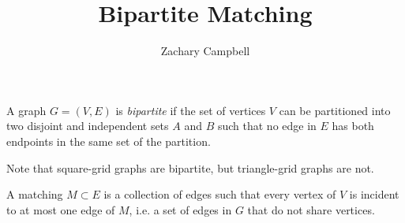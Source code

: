 \documentclass[11pt]{article}
\newenvironment{definition}[2][Definition]{\begin{trivlist}
\item[\hskip \labelsep {\bfseries #1}\hskip \labelsep {\bfseries #2.}]}{\end{trivlist}}
\begin{document}
\title{Bipartite Matching}
\author{Zachary Campbell}

\maketitle

\begin{definition}{(Bipartite graph)}
	A graph $G = (V, E)$ is \emph{bipartite} if the set of vertices $V$ can be partitioned into 
	two disjoint and independent sets $A$ and $B$ such that no edge in $E$ has both endpoints in 
	the same set of the partition.
\end{definition}

Note that square-grid graphs are bipartite, but triangle-grid graphs are not. 

\begin{definition}{(Matching)}
	A matching $M\subset E$ is a collection of edges such that every vertex of $V$ is incident 
	to at most one edge of $M$, i.e. a set of edges in $G$ that do not share vertices.
\end{definition}
\end{document}
